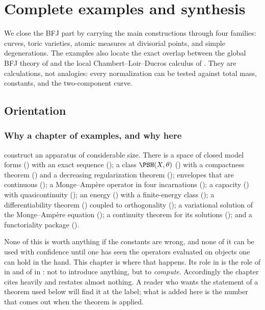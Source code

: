 \chapter{Complete examples and synthesis}
\label{chap:bfj-examples}

We close the BFJ part by carrying the main constructions through four
families: curves, toric varieties, atomic measures at divisorial points, and
simple degenerations.  The examples also locate the exact overlap between the
global BFJ theory of  and the local Chambert--Loir--Ducros
calculus of .  They are calculations, not analogies: every
normalization can be tested against total mass, constants, and the
two-component curve.

\section{Orientation}
\label{sec:ch31-orientation}

\subsection{Why a chapter of examples, and why here}
\label{sec:ch31-why}

 construct an
apparatus of considerable size.  There is a space of closed model forms
() with an exact sequence
(); a class \(\PSH(X,\theta)\)
() with a compactness theorem
() and a decreasing regularization theorem
(); envelopes that are continuous
(); a Monge--Amp\`ere operator in four
incarnations (); a capacity
() with quasicontinuity
(); an energy
() with a finite-energy class
(); a differentiability theorem
() coupled to orthogonality
(); a variational solution of the
Monge--Amp\`ere equation (); a continuity theorem
for its solutions (); and a
functoriality package ().

None of this is worth anything if the constants are wrong, and none of it can
be used with confidence until one has seen the operators evaluated on
objects one can hold in the hand.  This chapter is where that happens.  Its
role in  is the role of  in
 and of  in : not to
introduce anything, but to \emph{compute}.  Accordingly the chapter cites
heavily and restates almost nothing.  A reader who wants the statement of a
theorem used below will find it at the label; what is added here is the
number that comes out when the theorem is applied.

